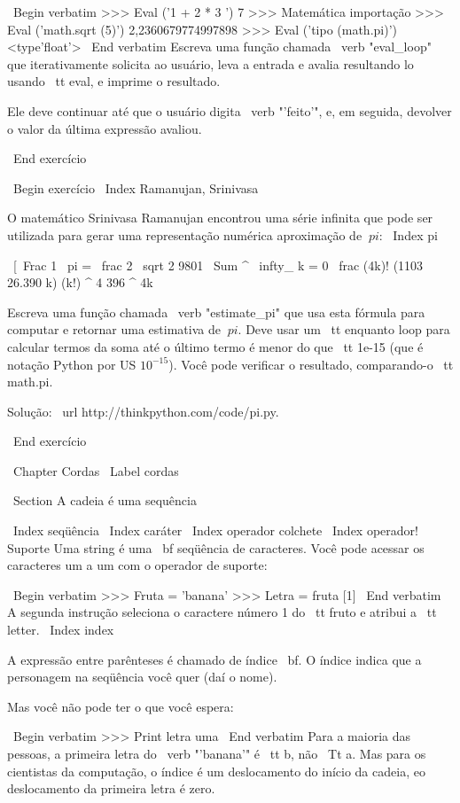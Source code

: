 \documentclass[10pt]{book}
\begin{document}
\begin {itemize}
{{{{\ Begin {verbatim}
>>> Eval ('1 + 2 * 3 ')
7
>>> Matemática importação
>>> Eval ('math.sqrt (5)')
2,2360679774997898
>>> Eval ('tipo (math.pi)')
<type'float'>
\ End {verbatim}
%
Escreva uma função chamada \ verb "eval_loop" que iterativamente
solicita ao usuário, leva a entrada e avalia resultando
lo usando {\ tt eval}, e imprime o resultado.

Ele deve continuar até que o usuário digita \ verb "'feito'", e, em seguida,
devolver o valor da última expressão avaliou.

\ End {} exercício


\ Begin {} exercício
\ Index {Ramanujan, Srinivasa}

O matemático Srinivasa Ramanujan encontrou uma
série infinita
que pode ser utilizada para gerar uma representação numérica
aproximação de $ \ pi $:
\ Index {pi}

\ [\ Frac {1} {\ pi} = \ frac {2 \ sqrt {2}} {9801} 
\ Sum ^ \ infty_ {k = 0} \ frac {(4k)! (1103 26.390 k)} {(k!) ^ 4 396 ^ {4k}} \]

Escreva uma função chamada \ verb "estimate_pi" que usa esta fórmula
para computar e retornar uma estimativa de $ \ pi $. Deve usar um {\ tt enquanto}
loop para calcular termos da soma até o último termo é
menor do que {\ tt 1e-15} (que é notação Python por US $ 10 ^ {-15} $).
Você pode verificar o resultado, comparando-o {\ tt math.pi}.

Solução: \ url {http://thinkpython.com/code/pi.py}.

\ End {} exercício


\ Chapter {} Cordas
\ Label {} cordas


\ Section {A cadeia é uma sequência}

\ Index {seqüência}
\ Index {caráter}
\ Index {operador colchete}
\ Index {operador! Suporte}
Uma string é uma {\ bf seqüência de caracteres}.  
Você pode acessar os caracteres um a um com o
operador de suporte:

\ Begin {verbatim}
>>> Fruta = 'banana'
>>> Letra = fruta [1]
\ End {verbatim}
%
A segunda instrução seleciona o caractere número 1 do {\ tt
fruto} e atribui a {\ tt letter}.  
\ Index {index}

A expressão entre parênteses é chamado de índice {\ bf}.  
O índice indica que a personagem na seqüência você
quer (daí o nome).

Mas você não pode ter o que você espera:

\ Begin {verbatim}
>>> Print letra
uma
\ End {verbatim}
%
Para a maioria das pessoas, a primeira letra do \ verb "'banana'" é {\ tt b}, não
{\ Tt a}. Mas para os cientistas da computação, o índice é um deslocamento do
início da cadeia, eo deslocamento da primeira letra é zero.

}}}}
\end{itemize}
\end{document}
